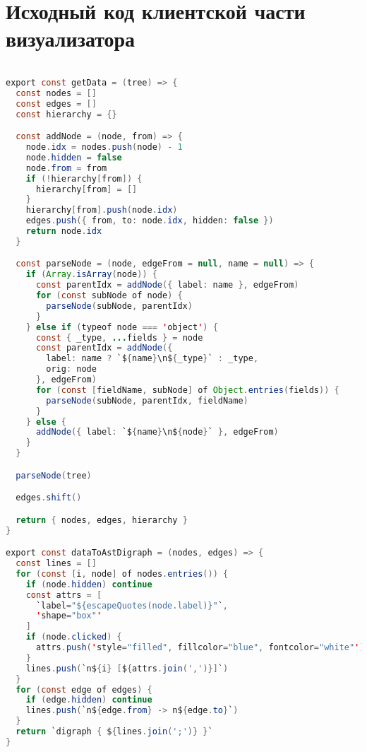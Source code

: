 \chapter{Исходный код клиентской части визуализатора}\label{appendix-MikTeX-TexStudio}							%

\lstset{
frame=single,
numbersep = 5pt,
stepnumber = 1
}

\begin{lstlisting}[language=Java,
caption={ast.js}]

export const getData = (tree) => {
  const nodes = []
  const edges = []
  const hierarchy = {}

  const addNode = (node, from) => {
    node.idx = nodes.push(node) - 1
    node.hidden = false
    node.from = from
    if (!hierarchy[from]) {
      hierarchy[from] = []
    }
    hierarchy[from].push(node.idx)
    edges.push({ from, to: node.idx, hidden: false })
    return node.idx
  }

  const parseNode = (node, edgeFrom = null, name = null) => {
    if (Array.isArray(node)) {
      const parentIdx = addNode({ label: name }, edgeFrom)
      for (const subNode of node) {
        parseNode(subNode, parentIdx)
      }
    } else if (typeof node === 'object') {
      const { _type, ...fields } = node
      const parentIdx = addNode({
        label: name ? `${name}\n${_type}` : _type,
        orig: node
      }, edgeFrom)
      for (const [fieldName, subNode] of Object.entries(fields)) {
        parseNode(subNode, parentIdx, fieldName)
      }
    } else {
      addNode({ label: `${name}\n${node}` }, edgeFrom)
    }
  }

  parseNode(tree)

  edges.shift()

  return { nodes, edges, hierarchy }
}

export const dataToAstDigraph = (nodes, edges) => {
  const lines = []
  for (const [i, node] of nodes.entries()) {
    if (node.hidden) continue
    const attrs = [
      `label="${escapeQuotes(node.label)}"`,
      'shape="box"'
    ]
    if (node.clicked) {
      attrs.push('style="filled", fillcolor="blue", fontcolor="white"')
    }
    lines.push(`n${i} [${attrs.join(',')}]`)
  }
  for (const edge of edges) {
    if (edge.hidden) continue
    lines.push(`n${edge.from} -> n${edge.to}`)
  }
  return `digraph { ${lines.join(';')} }`
}
\end{lstlisting}


